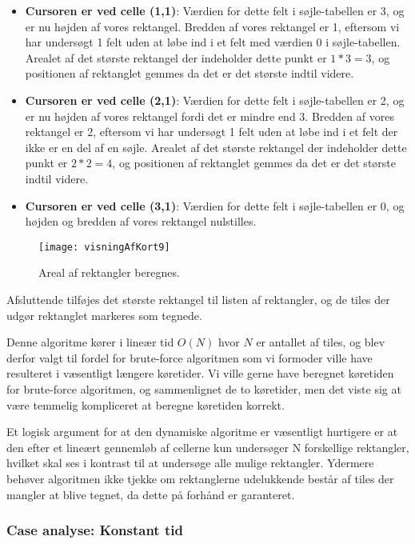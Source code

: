 \begin{itemize}
	\item \textbf{Cursoren er ved celle (1,1)}: Værdien for dette felt i søjle-tabellen er 3, og er nu højden af vores rektangel. Bredden af vores rektangel er 1, eftersom vi har undersøgt 1 felt uden at løbe ind i et felt med værdien 0 i søjle-tabellen. Arealet af det største rektangel der indeholder dette punkt er $1 * 3 = 3$, og positionen af rektanglet gemmes da det er det største indtil videre.
	\item \textbf{Cursoren er ved celle (2,1)}: Værdien for dette felt i søjle-tabellen er 2, og er nu højden af vores rektangel fordi det er mindre end 3. Bredden af vores rektangel er 2, eftersom vi har undersøgt 1 felt uden at løbe ind i et felt der ikke er en del af en søjle. Arealet af det største rektangel der indeholder dette punkt er $2 * 2 = 4$, og positionen af rektanglet gemmes da det er det største indtil videre.
	\item \textbf{Cursoren er ved celle (3,1)}: Værdien for dette felt i søjle-tabellen er 0, og højden og bredden af vores rektangel nulstilles.
\end{itemize}

\begin{figure}[h]
	\centering
	\texttt{[image: visningAfKort9]}
	\captionsetup{width=0.8\textwidth}
	\caption{Areal af rektangler beregnes.}
	\label{figur:visningAfKort9}
\end{figure}

Afsluttende tilføjes det største rektangel til listen af rektangler, og de tiles der udgør rektanglet markeres som tegnede.

Denne algoritme kører i lineær tid $O(N)$ hvor $N$ er antallet af tiles, og blev derfor valgt til fordel for brute-force algoritmen som vi formoder ville have resulteret i væsentligt længere køretider. Vi ville gerne have beregnet køretiden for brute-force algoritmen, og sammenlignet de to køretider, men det viste sig at være temmelig kompliceret at beregne køretiden korrekt.

Et logisk argument for at den dynamiske algoritme er væsentligt hurtigere er at den efter et lineært gennemløb af cellerne kun undersøger N forskellige rektangler, hvilket skal ses i kontrast til at undersøge alle mulige rektangler. Ydermere behøver algoritmen ikke tjekke om rektanglerne udelukkende består af tiles der mangler at blive tegnet, da dette på forhånd er garanteret.

\subsubsection{Case analyse: Konstant tid}
\label{subsec:caseAnalyse}

